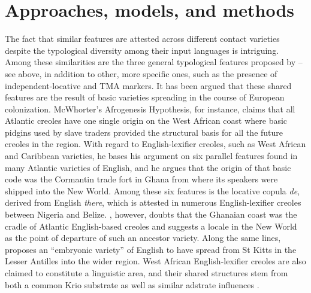 \documentclass[output=paper]{langscibook}
\begin{document}
\section{Approaches, models, and methods} \label{sec:contact:approaches}


The fact that similar features are attested across different contact varieties despite the typological diversity among their input languages is intriguing. Among these similarities are the three general typological features proposed by \textcite{mcworther1998identifying} -- see above, in addition to other, more specific ones, such as the presence of independent-locative and TMA markers. It has been argued that these shared features are the result of basic varieties spreading in the course of European colonization. McWhorter’s \parencite*{mcworther2000missing} Afrogenesis Hypothesis, for instance, claims that all Atlantic creoles have one single origin on the West African coast where basic pidgins used by slave traders provided the structural basis for all the future creoles in the region. With regard to English-lexifier creoles, such as West African and Caribbean varieties, he bases his argument on six parallel features found in many Atlantic varieties of English, and he argues that the origin of that basic code was the Cormantin trade fort in Ghana from where its speakers were shipped into the New World. Among these six features is the locative copula \emph{de}, derived from English \emph{there}, which is attested in numerous English-lexifier creoles between Nigeria and Belize. \textcite{huber1999atlantic}, however, doubts that the Ghanaian coast was the cradle of Atlantic English-based creoles and suggests a locale in the New World as the point of departure of such an ancestor variety. Along the same lines, \textcite{baker1999investigating} proposes an “embryonic variety” of English to have spread from St Kitts in the Lesser Antilles into the wider region. West African English-lexifier creoles are also claimed to constitute a linguistic area, and their shared structures stem from both a common Krio substrate as well as similar adstrate influences \citep{yakpo2017towards}.
\end{document}

